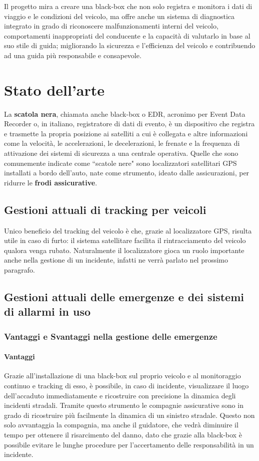 \documentclass[12pt, a4paper, italian]{report}
\numberwithin{figure}{chapter}
\numberwithin{table}{chapter}
\begin{document}
\vspace{1cm}

Il progetto mira a creare una black-box che non solo registra e monitora i dati di viaggio e le condizioni del veicolo, ma offre anche un sistema di diagnostica integrato in grado di riconoscere malfunzionamenti interni del veicolo, comportamenti inappropriati del conducente e la capacità di valutarlo in base al suo stile di guida; migliorando la sicurezza e l'efficienza del veicolo e contribuendo ad una guida più responsabile e consapevole.

\chapter{Stato dell'arte}
La \textbf{scatola nera}, chiamata anche black-box o EDR, acronimo per Event Data Recorder o, in italiano, registratore di dati di evento, è un dispositivo che registra e trasmette la propria posizione ai satelliti a cui è collegata e altre informazioni come la velocità, le accelerazioni, le decelerazioni, le frenate e la frequenza di attivazione dei sistemi di sicurezza a una centrale operativa.
Quelle che sono comunemente indicate come ``scatole nere" sono localizzatori satellitari GPS installati a bordo dell'auto, nate come strumento, ideato dalle assicurazioni, per ridurre le \textbf{frodi assicurative}.
\section{Gestioni attuali di tracking per veicoli}
Unico beneficio del tracking del veicolo è che, grazie al localizzatore GPS, risulta utile in caso di furto: il sistema satellitare facilita il rintracciamento del veicolo qualora venga rubato. Naturalmente il localizzatore gioca un ruolo importante anche nella gestione di un incidente, infatti ne verrà parlato nel prossimo paragrafo.
\section{Gestioni attuali delle emergenze e dei sistemi di allarmi in uso}
\subsection{Vantaggi e Svantaggi nella gestione delle emergenze}
\subsubsection{Vantaggi}
Grazie all'installazione di una black-box sul proprio veicolo e al monitoraggio continuo e tracking di esso, è possibile, in caso di incidente, visualizzare il luogo dell'accaduto immediatamente e ricostruire con precisione la dinamica degli incidenti stradali. Tramite questo strumento le compagnie assicurative sono in grado di ricostruire più facilmente la dinamica di un sinistro stradale. Questo non solo avvantaggia la compagnia, ma anche il guidatore, che vedrà diminuire il tempo per ottenere il risarcimento del danno, dato che grazie alla black-box è possibile evitare le lunghe procedure per l'accertamento delle responsabilità in un incidente.
\end{document}
